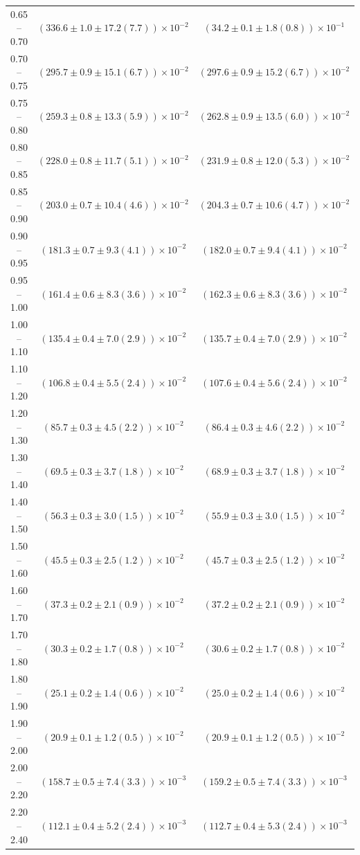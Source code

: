 \begin{table}
\begin{center}
\begin{tabular}{ c | c c }
0.65 -- 0.70 & $(336.6\pm1.0\pm17.2(7.7))\times10^{-2}$ & $(34.2\pm0.1\pm1.8(0.8))\times10^{-1}$ \\ 
0.70 -- 0.75 & $(295.7\pm0.9\pm15.1(6.7))\times10^{-2}$ & $(297.6\pm0.9\pm15.2(6.7))\times10^{-2}$ \\ 
0.75 -- 0.80 & $(259.3\pm0.8\pm13.3(5.9))\times10^{-2}$ & $(262.8\pm0.9\pm13.5(6.0))\times10^{-2}$ \\ 
0.80 -- 0.85 & $(228.0\pm0.8\pm11.7(5.1))\times10^{-2}$ & $(231.9\pm0.8\pm12.0(5.3))\times10^{-2}$ \\ 
0.85 -- 0.90 & $(203.0\pm0.7\pm10.4(4.6))\times10^{-2}$ & $(204.3\pm0.7\pm10.6(4.7))\times10^{-2}$ \\ 
0.90 -- 0.95 & $(181.3\pm0.7\pm9.3(4.1))\times10^{-2}$ & $(182.0\pm0.7\pm9.4(4.1))\times10^{-2}$ \\ 
0.95 -- 1.00 & $(161.4\pm0.6\pm8.3(3.6))\times10^{-2}$ & $(162.3\pm0.6\pm8.3(3.6))\times10^{-2}$ \\ 
1.00 -- 1.10 & $(135.4\pm0.4\pm7.0(2.9))\times10^{-2}$ & $(135.7\pm0.4\pm7.0(2.9))\times10^{-2}$ \\ 
1.10 -- 1.20 & $(106.8\pm0.4\pm5.5(2.4))\times10^{-2}$ & $(107.6\pm0.4\pm5.6(2.4))\times10^{-2}$ \\ 
1.20 -- 1.30 & $(85.7\pm0.3\pm4.5(2.2))\times10^{-2}$ & $(86.4\pm0.3\pm4.6(2.2))\times10^{-2}$ \\ 
1.30 -- 1.40 & $(69.5\pm0.3\pm3.7(1.8))\times10^{-2}$ & $(68.9\pm0.3\pm3.7(1.8))\times10^{-2}$ \\ 
1.40 -- 1.50 & $(56.3\pm0.3\pm3.0(1.5))\times10^{-2}$ & $(55.9\pm0.3\pm3.0(1.5))\times10^{-2}$ \\ 
1.50 -- 1.60 & $(45.5\pm0.3\pm2.5(1.2))\times10^{-2}$ & $(45.7\pm0.3\pm2.5(1.2))\times10^{-2}$ \\ 
1.60 -- 1.70 & $(37.3\pm0.2\pm2.1(0.9))\times10^{-2}$ & $(37.2\pm0.2\pm2.1(0.9))\times10^{-2}$ \\ 
1.70 -- 1.80 & $(30.3\pm0.2\pm1.7(0.8))\times10^{-2}$ & $(30.6\pm0.2\pm1.7(0.8))\times10^{-2}$ \\ 
1.80 -- 1.90 & $(25.1\pm0.2\pm1.4(0.6))\times10^{-2}$ & $(25.0\pm0.2\pm1.4(0.6))\times10^{-2}$ \\ 
1.90 -- 2.00 & $(20.9\pm0.1\pm1.2(0.5))\times10^{-2}$ & $(20.9\pm0.1\pm1.2(0.5))\times10^{-2}$ \\ 
2.00 -- 2.20 & $(158.7\pm0.5\pm7.4(3.3))\times10^{-3}$ & $(159.2\pm0.5\pm7.4(3.3))\times10^{-3}$ \\ 
2.20 -- 2.40 & $(112.1\pm0.4\pm5.2(2.4))\times10^{-3}$ & $(112.7\pm0.4\pm5.3(2.4))\times10^{-3}$ \\ 

\end{tabular}
\end{center}
\end{table}
